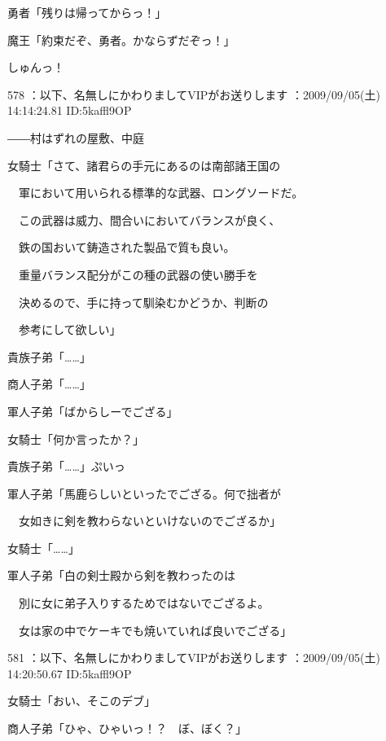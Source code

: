 \documentclass[a4j,twocolumn]{tarticle}
\begin{document}
勇者「残りは帰ってからっ！」\par{} 
魔王「約束だぞ、勇者。かならずだぞっ！」 



しゅんっ！ 

	
    
    

578 ：以下、名無しにかわりましてVIPがお送りします ：2009/09/05(土) 14:14:24.81 ID:5kaffl9OP 


――村はずれの屋敷、中庭 



女騎士「さて、諸君らの手元にあるのは南部諸王国の\par{} 
　軍において用いられる標準的な武器、ロングソードだ。\par{} 
　この武器は威力、間合いにおいてバランスが良く、\par{} 
　鉄の国おいて鋳造された製品で質も良い。\par{} 
　重量バランス配分がこの種の武器の使い勝手を\par{} 
　決めるので、手に持って馴染むかどうか、判断の\par{} 
　参考にして欲しい」 



貴族子弟「……」\par{} 
商人子弟「……」\par{} 
軍人子弟「ばからしーでござる」 



女騎士「何か言ったか？」 



貴族子弟「……」ぷいっ\par{} 
軍人子弟「馬鹿らしいといったでござる。何で拙者が\par{} 
　女如きに剣を教わらないといけないのでござるか」 



女騎士「……」 



軍人子弟「白の剣士殿から剣を教わったのは\par{} 
　別に女に弟子入りするためではないでござるよ。\par{} 
　女は家の中でケーキでも焼いていれば良いでござる」 

	
    
    

581 ：以下、名無しにかわりましてVIPがお送りします ：2009/09/05(土) 14:20:50.67 ID:5kaffl9OP 


女騎士「おい、そこのデブ」\par{} 
商人子弟「ひゃ、ひゃいっ！？　ぼ、ぼく？」 
\end{document}
